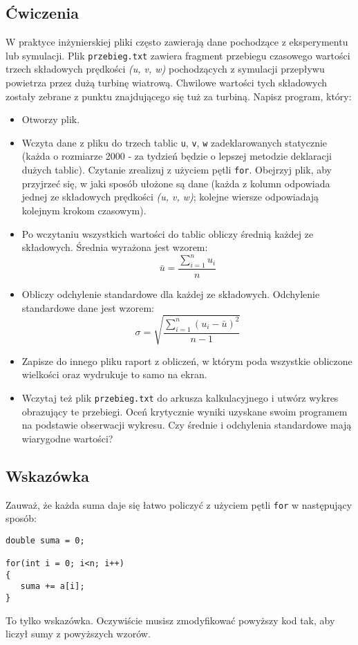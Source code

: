 \documentclass{instrukcja}
\begin{document}
\subsection*{Ćwiczenia}
W praktyce inżynierskiej pliki często zawierają dane pochodzące z eksperymentu lub symulacji. Plik {\tt przebieg.txt} zawiera fragment przebiegu czasowego wartości trzech składowych prędkości {\it (u, v, w)} pochodzących z symulacji przepływu powietrza przez dużą turbinę wiatrową. Chwilowe wartości tych składowych zostały zebrane z punktu znajdującego się tuż za turbiną. Napisz program, który:
\begin{itemize}
\item Otworzy plik.
\item Wczyta dane z pliku do trzech tablic {\tt u}, {\tt v}, {\tt w} zadeklarowanych statycznie (każda o rozmiarze 2000 - za tydzień będzie o lepszej metodzie deklaracji dużych tablic). Czytanie zrealizuj z użyciem pętli {\tt for}. Obejrzyj plik, aby przyjrzeć się, w jaki sposób ułożone są dane (każda z kolumn odpowiada jednej ze składowych prędkości {\it (u, v, w)}; kolejne wiersze odpowiadają kolejnym krokom czasowym).
\item Po wczytaniu wszystkich wartości do tablic obliczy średnią każdej ze składowych. Średnia wyrażona jest wzorem:
\begin{equation}
\bar{u} = \frac{\displaystyle{\sum_{i=1}^n u_i}}{n}
\end{equation}
\item Obliczy odchylenie standardowe dla każdej ze składowych. Odchylenie standardowe dane jest wzorem:
\begin{equation}
\displaystyle{\sigma = \sqrt{\frac{\displaystyle{\sum_{i=1}^n (u_i - \bar{u})^2}}{n-1}}}
\end{equation}
\item Zapisze do innego pliku raport z obliczeń, w którym poda wszystkie obliczone wielkości oraz wydrukuje to samo na ekran.
\item Wczytaj też plik {\tt przebieg.txt} do arkusza kalkulacyjnego i utwórz wykres obrazujący te przebiegi. Oceń krytycznie wyniki uzyskane swoim programem na podstawie obserwacji wykresu. Czy średnie i odchylenia standardowe mają wiarygodne wartości?
\end{itemize}
\subsection*{Wskazówka}
Zauważ, że każda suma daje się łatwo policzyć z użyciem pętli {\tt for} w następujący sposób:
\begin{verbatim}
double suma = 0;

for(int i = 0; i<n; i++)
{
   suma += a[i];
}
\end{verbatim}
To tylko wskazówka. Oczywiście musisz zmodyfikować powyższy kod tak, aby liczył sumy z powyższych wzorów.
\end{document}
